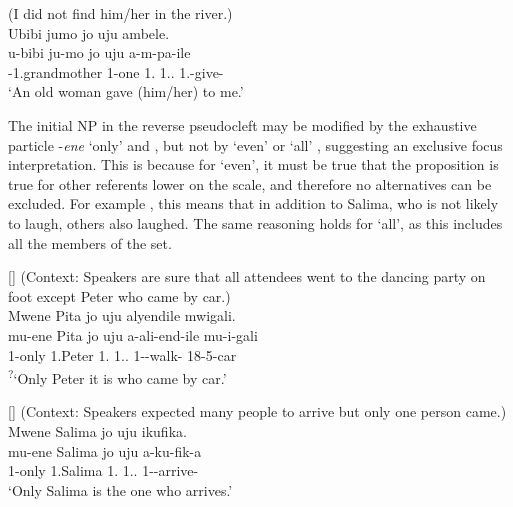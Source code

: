 \documentclass[output=paper]{langscibook}
\begin{document}
\ea
\label{bkm:Ref136510605}
(I did not find him/her in the river.)\\
Ubibi jumo jo uju ambele.\\
\gll
u-bibi  ju-mo  jo  uju  a-m-pa-ile\\
\AUG{}-1.grandmother  1-one  1.\IDCOP{}  1.\DEM.\PROX{}  1\SG.\OM{}-give-\PFV{}\\
\glt
‘An old woman gave (him/her) to me.’\\

\z


The initial NP in the reverse pseudocleft may be modified by the exhaustive particle -\textit{ene} ‘only’  and , but not by ‘even’  or ‘all’ , suggesting an exclusive focus interpretation. This is because for ‘even’, it must be true that the proposition is true for other referents lower on the scale, and therefore no alternatives can be excluded. For example  , this means that in addition to Salima, who is not likely to laugh, others also laughed. The same reasoning holds for ‘all’, as this includes all the members of the set.

\ea
[]{
\label{bkm:Ref148771823}
(Context: Speakers are sure that all attendees went to the dancing party on foot except Peter who came by car.) \\
Mwene Pita jo uju alyendile mwigali.\\
\gll
mu-ene  Pita  jo  uju  a-ali-end-ile  mu-i-gali\\
1-only  1.Peter  1.\IDCOP{}  1.\DEM.\PROX{}  1\SM-\PST{}-walk-\PFV{}  18-5-car\\
\glt
\textsuperscript{?}‘Only Peter it is who came by car.’\\
}

\z


\ea
[]{
\label{bkm:Ref148771845}
(Context: Speakers expected many people to arrive but only one person came.)\\
Mwene Salima jo uju ikufika.\\
\gll
mu-ene  Salima  jo  uju  a-ku-fik-a\\
1-only  1.Salima  1.\PRO{}  1.\DEM.\PROX{}  1\SM-\PRS{}-arrive-\FV{}\\
\glt
‘Only Salima is the one who arrives.’\\
}
\end{document}
